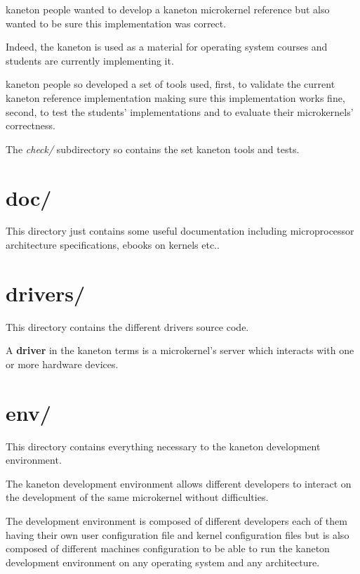 kaneton people wanted to develop a kaneton microkernel reference but
also wanted to be sure this implementation was correct.

Indeed, the kaneton is used as a material for operating system courses and
students are currently implementing it.

kaneton people so developed a set of tools used, first, to validate the
current kaneton reference implementation making sure this implementation
works fine, second, to test the students' implementations and to evaluate
their microkernels' correctness.

The \textit{check/} subdirectory so contains the set kaneton tools and tests.

%
%

\section{doc/}

This directory just contains some useful documentation including
microprocessor architecture specifications, ebooks on kernels etc..

%
%

\section{drivers/}

This directory contains the different drivers source code.

A \textbf{driver} in the kaneton terms is a microkernel's server which
interacts with one or more hardware devices.

%
%

\section{env/}

This directory contains everything necessary to the kaneton
development environment.

The kaneton development environment allows different developers to
interact on the development of the same microkernel without difficulties.

The development environment is composed of different developers each
of them having their own user configuration file and kernel configuration
files but is also composed of different machines configuration to be able
to run the kaneton development environment on any operating system and any
architecture.

